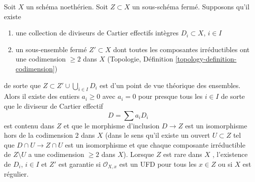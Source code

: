 \begin{lemma}
\label{lemma-codim-1-part}
Soit  $X$  un schéma noethérien. Soit  $Z \subset X$  un sous-schéma fermé.
Supposons qu'il existe
\begin{enumerate}
\item une collection de diviseurs de Cartier effectifs intègres  $D_i \subset X$,
 $i \in I$
\item un sous-ensemble fermé  $Z' \subset X$  dont toutes les composantes irréductibles ont
une codimension  $\geq 2$  dans  $X$  (Topologie, Définition
 \ref{topology-definition-codimension})
\end{enumerate}
de sorte que  $Z \subset Z' \cup \bigcup_{i \in I} D_i$  est d'un point de vue théorique des ensembles. Alors il
existe des entiers  $a_i \geq 0$  avec  $a_i = 0$  pour presque tous les
 $i \in I$  de sorte que le diviseur de Cartier effectif
$$
D = \sum a_i D_i
$$
est contenu dans  $Z$  et que le morphisme d'inclusion  $D \to Z$  est un
isomorphisme hors de la codimension  $2$  dans  $X$  (dans le sens
qu'il existe un ouvert  $U \subset Z$  tel que  $D \cap U \to Z \cap U$  est un isomorphisme et
que chaque composante irréductible de  $Z \setminus U$  a une codimension  $\geq 2$ 
dans  $X$). Lorsque  $Z$  est rare dans  $X$ , l'existence
de  $D_i$,  $i \in I$  et  $Z'$  est garantie si  $\mathcal{O}_{X, x}$  est un
UFD pour tous les  $x \in Z$  ou si  $X$  est régulier.
\end{lemma}


